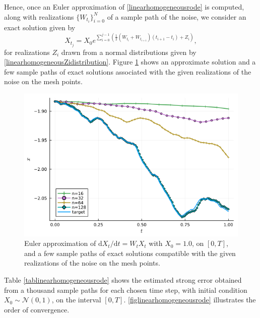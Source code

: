 \documentclass[reqno,12pt]{amsart}
\theoremstyle{plain} %
\theoremstyle{definition} %
\begin{document}
Hence, once an Euler approximation of \eqref{linearhomogeneousrode} is computed, along with realizations $\{W_{t_i}\}_{i=0}^N$ of a sample path of the noise, we consider an exact solution given by
\begin{equation}
    \label{Xtlinearhomogeneousrode}
    X_{t_j} = X_0 e^{\sum_{i = 0}^{j-1}\left(\frac{1}{2}\left(W_{t_i} + W_{t_{i+1}}\right)(t_{i+1} - t_i) + Z_i\right)},
\end{equation}
for realizations $Z_i$ drawn from a normal distributions given by \eqref{linearhomogeneousZidistribution}. Figure \ref{samplepathslinearhomogeneousrode} shows an approximate solution and a few sample paths of exact solutions associated with the given realizations of the noise on the mesh points.
\begin{figure}
    \includegraphics[scale=0.4]{img/approximation_linearhomogenous.png}
    \caption{Euler approximation of $\mathrm{d}X_t/\mathrm{d}t = W_t X_t$ with $X_0 = 1.0$, on $[0, T]$, and a few sample paths of exact solutions compatible with the given realizations of the noise on the mesh points.}
    \label{samplepathslinearhomogeneousrode}
\end{figure}

Table \ref{tablinearhomogeneousrode} shows the estimated strong error obtained from a thousand sample paths for each chosen time step, with initial condition $X_0 \sim \mathcal{N}(0, 1)$, on the interval $[0, T]$. \cref{figlinearhomogeneousrode} illustrates the order of convergence.
\end{document}
